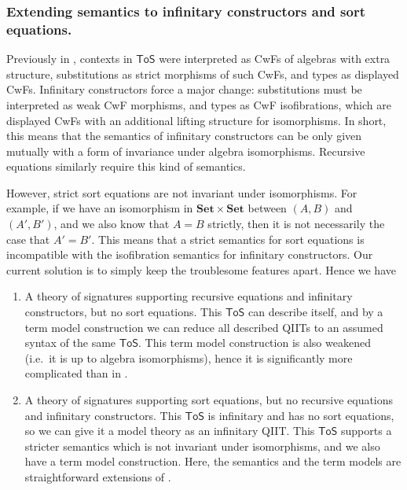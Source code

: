 \documentclass{easychair}
\newcommand{\ToS}{\mathsf{ToS}}
\begin{document}
\subsubsection*{Extending semantics to infinitary constructors and sort equations.}
Previously in \cite{kaposi2019constructing}, contexts in $\ToS$ were interpreted
as CwFs of algebras with extra structure, substitutions as strict morphisms of
such CwFs, and types as displayed CwFs. Infinitary constructors force a major
change: substitutions must be interpreted as weak CwF morphisms, and types as
CwF isofibrations, which are displayed CwFs with an additional lifting structure
for isomorphisms. In short, this means that the semantics of infinitary
constructors can be only given mutually with a form of invariance under algebra
isomorphisms. Recursive equations similarly require this kind of semantics.

However, strict sort equations are not invariant under isomorphisms. For
example, if we have an isomorphism in $\mathbf{Set}\times\mathbf{Set}$ between
$(A, B)$ and $(A', B')$, and we also know that $A = B$ strictly, then it is not
necessarily the case that $A' = B'$. This means that a strict semantics for sort
equations is incompatible with the isofibration semantics for infinitary
constructors. Our current solution is to simply keep the troublesome features
apart. Hence we have
\begin{enumerate}
\item A theory of signatures supporting recursive equations and infinitary
  constructors, but no sort equations. This $\ToS$ can describe itself, and by a
  term model construction we can reduce all described QIITs to an assumed syntax
  of the same $\ToS$. This term model construction is also weakened (i.e.\ it is
  up to algebra isomorphisms), hence it is significantly more complicated than
  in \cite{kaposi2019constructing}.
\item A theory of signatures supporting sort equations, but no recursive
  equations and infinitary constructors. This $\ToS$ is infinitary and has no
  sort equations, so we can give it a model theory as an infinitary QIIT. This
  $\ToS$ supports a stricter semantics which is not invariant under
  isomorphisms, and we also have a term model construction. Here, the semantics
  and the term models are straightforward extensions of
  \cite{kaposi2019constructing}.
\end{enumerate}



\end{document}
